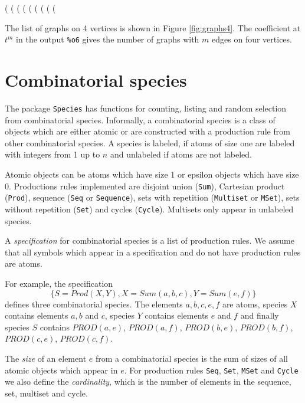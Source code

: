 \documentclass[10pt]{article}
\newcommand{\command}[1]{\texttt{#1}}
\newcommand{\DEF}[1]{{\em #1}}
\begin{document}
\begin{example}
(%
(%
(%
(%
(%
(%
(%
(%
(%
\end{example}
%
The list of graphs on 4 vertices is shown in Figure \ref{fig:graphs4}.
The coefficient at $t^m$ in the output \verb|%o6|
gives the number of graphs with $m$ edges on four vertices.

\section{Combinatorial species}

The package \command{Species} has functions for counting, listing and
random selection from combinatorial species. Informally, a
combinatorial species is a class of objects which are either atomic or
are constructed with a production rule from other combinatorial
species. A species is labeled, if atoms of size one are labeled with
integers from 1 up to $n$ and unlabeled if atoms are not labeled.

Atomic objects can be atoms which have size 1 or epsilon objects which
have size 0. Productions rules implemented are disjoint union
(\command{Sum}), Cartesian product (\command{Prod}), sequence
(\command{Seq} or \command{Sequence}), sets with repetition
(\command{Multiset} or \command{MSet}), sets without repetition
(\command{Set}) and cycles (\command{Cycle}). Multisets only appear in
unlabeled species.

A \DEF{specification} for combinatorial species is a list of
production rules. We assume that all symbols which appear in a
specification and do not have production rules are atoms.

For example, the specification
$$
\{S=Prod(X, Y), X=Sum(a, b, c), Y=Sum(e, f)\}
$$
defines three combinatorial species. The elements $a, b, c, e, f$ are
atoms, species $X$ contains elements $a, b$ and $c$, species $Y$
contains elements $e$ and $f$ and finally species $S$ contains
$PROD(a, e)$, $PROD(a, f)$, $PROD(b, e)$, $PROD(b, f)$, $PROD(c, e)$,
$PROD(c, f)$.

The \DEF{size} of an element $e$ from a combinatorial species is the
sum of sizes of all atomic objects which appear in $e$. For production
rules \command{Seq}, \command{Set}, \command{MSet} and \command{Cycle}
we also define the \DEF{cardinality}, which is the number of elements
in the sequence, set, multiset and cycle.
\end{document}
